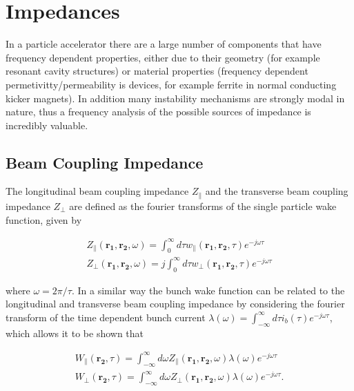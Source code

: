 \section{Impedances}

In a particle accelerator there are a large number of components that have frequency dependent properties, either due to their geometry (for example resonant cavity structures) or material properties (frequency dependent permetivitty/permeability is devices, for example ferrite in normal conducting kicker magnets). In addition many instability mechanisms are strongly modal in nature, thus a frequency analysis of the possible sources of impedance is incredibly valuable. 

\subsection{Beam Coupling Impedance}

The longitudinal beam coupling impedance $Z_{\parallel}$ and the transverse beam coupling impedance $Z_{\perp}$ are defined as the fourier transforms of the single particle wake function, given by

\begin{align}
Z_{\parallel} \left(\mathbf{r_{1}}, \mathbf{r_{2}}, \omega  \right) = \int^{\infty}_{0} d\tau w_{\parallel} \left(\mathbf{r_{1}}, \mathbf{r_{2}}, \tau  \right) e^{-j\omega \tau}\\
Z_{\perp} \left(\mathbf{r_{1}}, \mathbf{r_{2}}, \omega  \right) = j \int^{\infty}_{0} d\tau w_{\perp} \left(\mathbf{r_{1}}, \mathbf{r_{2}}, \tau  \right) e^{-j\omega \tau} \label{eqn:total_trans_imp}
\end{align}

where $\omega = 2\pi / \tau$. In a similar way the bunch wake function can be related to the longitudinal and transverse beam coupling impedance by considering the fourier transform of the time dependent bunch current $\lambda \left( \omega  \right) = \int^{\infty}_{-\infty} d\tau i_{b}\left( \tau \right) e^{-j \omega \tau}$, which allows it to be shown that

\begin{align}
W_{\parallel}  \left( \mathbf{r_{2}}, \tau \right) = \int^{\infty}_{- \infty} d \omega Z_{\parallel} \left(\mathbf{r_{1}}, \mathbf{r_{2}}, \omega  \right) \lambda \left( \omega  \right) e^{-j \omega \tau} \\
W_{\perp}  \left( \mathbf{r_{2}}, \tau \right) = \int^{\infty}_{- \infty} d \omega Z_{\perp} \left(\mathbf{r_{1}}, \mathbf{r_{2}}, \omega  \right) \lambda \left( \omega  \right) e^{-j \omega \tau}.
\end{align}


